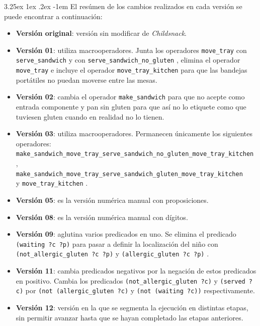\documentclass{article}
\makeatletter
\newcommand{\cool}[1] {
        {\texttt{#1}}
    }
\renewcommand\paragraph{\@startsection{paragraph}{5}{\z@}%
      {3.25ex \@plus1ex \@minus.2ex}%
      {-1em}%
      {\normalfont\normalsize\bfseries}}
\makeatother
\begin{document}
    \paragraph{}
    El resúmen de los cambios realizados en cada versión se puede encontrar a continuación:
    \begin{itemize}
        \item \textbf{Versión original}: versión sin modificar de \textit{Childsnack}.
        \item \textbf{Versión 01}: utiliza macrooperadores. Junta los operadores \cool{move\_tray} con \cool{serve\_sandwich} y con  \cool{serve\_sandwich\_no\_gluten}, elimina el operador \\ \cool{move\_tray} e incluye el operador \cool{move\_tray\_kitchen} para que las bandejas portátiles no puedan moverse entre las mesas.
        \item \textbf{Versión 02}: cambia el operador \cool{make\_sandwich} para que no acepte como entrada componente y pan sin gluten para que así no lo etiquete como que tuviesen gluten cuando en realidad no lo tienen.
        \item \textbf{Versión 03}: utiliza macrooperadores. Permanecen únicamente los siguientes operadores:\\ \cool{make\_sandwich\_move\_tray\_serve\_sandwich\_no\_gluten\_move\_tray\_kitchen}, \\ \cool{make\_sandwich\_move\_tray\_serve\_sandwich\_gluten\_move\_tray\_kitchen} \\ y \cool{move\_tray\_kitchen}.
        \item \textbf{Versión 05}: es la versión numérica manual con proposiciones.
        \item \textbf{Versión 08}: es la versión numérica manual con dígitos.
        \item  \textbf{Versión 09}: aglutina varios predicados en uno. Se elimina el predicado \\ \cool{(waiting ?c ?p)} para pasar a definir la localización del niño con \\ \cool{(not\_allergic\_gluten ?c ?p)} y \cool{(allergic\_gluten ?c ?p)}.
        \item \textbf{Versión 11}: cambia predicados negativos por la negación de estos predicados en positivo. Cambia los predicados \cool{(not\_allergic\_gluten ?c)} y \cool{(served ?c)} por \cool{(not (allergic\_gluten ?c)} y \cool{(not (waiting ?c))} respectivamente.
        \item \textbf{Versión 12}: versión en la que se segmenta la ejecución en distintas etapas, sin permitir avanzar hasta que se hayan completado las etapas anteriores.

\end{itemize}
\end{document}
